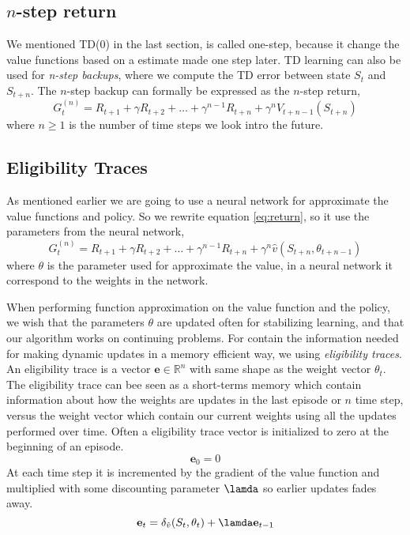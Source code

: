 \documentclass[11pt]{article}
\begin{document}
\subsection{$n$-step return}
We mentioned TD(0) in the last section, is called one-step, because it change the value functions based on a estimate made one step later. TD learning can also be used for \textit{n-step backups}, where we compute the TD error between state $S_{t}$ and $S_{t + n}$. The $n$-step backup can formally be expressed as the $n$-step return,
\begin{equation}\label{eq:return}
    G_{t}^{(n)} = R_{t + 1} + \gamma R_{t + 2} + \dots + \gamma^{n - 1} R_{t + n} + \gamma^{n} V_{t + n - 1}(S_{t + n})
\end{equation}
where $n \geq 1$ is the number of time steps we look intro the future. 

\subsection{Eligibility Traces}
As mentioned earlier we are going to use a neural network for approximate the value functions and policy. So we rewrite equation \ref{eq:return}, so it use the parameters from the neural network,
\begin{equation}
    G_{t}^{(n)} = R_{t + 1} + \gamma R_{t + 2} + \dots + \gamma^{n - 1} R_{t + n} + \gamma^{n} \hat{v}(S_{t + n}, \theta_{t + n - 1})
\end{equation}
where $\theta$ is the parameter used for approximate the value, in a neural network it correspond to the weights in the network. 

When performing function approximation on the value function and the policy, we wish that the parameters $\theta$ are updated often for stabilizing learning, and that our algorithm works on continuing problems. For contain the information needed for making dynamic updates in a memory efficient way, we using \textit{eligibility traces}. An eligibility trace is a vector $\mathbf{e} \in \mathds{R}^{n}$ with same shape as the weight vector $\theta_{t}$. The eligibility trace can bee seen as a short-terms memory which contain information about how the weights are updates in the last episode or $n$ time step, versus the weight vector which contain our current weights using all the updates performed over time. Often a eligibility trace vector is initialized to zero at the beginning of an episode.
\begin{equation}
  \mathbf{e}_{0} = 0  
\end{equation}
At each time step it is incremented by the gradient of the value function and multiplied with some discounting parameter $\lamda$ so earlier updates fades away.
\begin{equation}
  \mathbf{e}_{t} = \delta_{\hat{v}}(S_{t}, \theta_{t}) + \lamda \mathbf{e}_{t - 1}
\end{equation}
\end{document}
